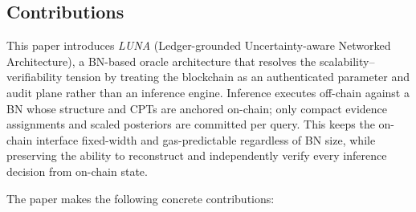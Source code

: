 \documentclass[journal]{IEEEtran}
\begin{document}
\subsection{Contributions}

This paper introduces \emph{LUNA} (Ledger-grounded
Uncertainty-aware Networked Architecture), a BN-based
oracle architecture that resolves the
scalability--verifiability tension by treating the
blockchain as an authenticated parameter and audit plane
rather than an inference engine.
Inference executes off-chain against a BN whose structure
and CPTs are anchored on-chain; only compact evidence
assignments and scaled posteriors are committed per query.
This keeps the on-chain interface fixed-width and
gas-predictable regardless of BN size, while preserving
the ability to reconstruct and independently verify every
inference decision from on-chain state.

The paper makes the following concrete contributions:
\end{document}
